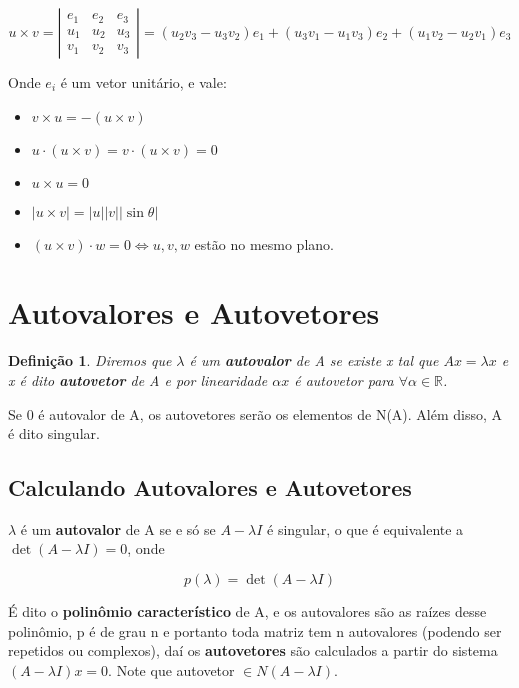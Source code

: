 \documentclass[12pt]{article}
\newtheorem{definition}{Definição}
\begin{document}
$$u \times v = \left| \begin{array}{ccc}
    e_1 & e_2 & e_3 \\
    u_1 & u_2 & u_3 \\
    v_1 & v_2 & v_3
\end{array} \right| = (u_2 v_3 - u_3 v_2)e_1 + (u_3 v_1 - u_1 v_3)e_2 + (u_1 v_2 - u_2 v_1)e_3$$

Onde $e_i$ é um vetor unitário, e vale:

\begin{itemize}
    \item $v \times u = - (u \times v)$
    
    \item $u \cdot (u \times v) = v \cdot (u \times v) = 0$
    
    \item $u \times u = 0$
    
    \item $|u \times v| = |u||v||\sin{\theta}|$
    
    \item $(u \times v) \cdot w = 0 \Leftrightarrow u,v,w $ estão no mesmo plano.
\end{itemize}

\section*{Autovalores e Autovetores}
\begin{definition}
Diremos que $\lambda$ é um \textbf{autovalor} de A se existe x tal que $Ax = \lambda x$ e x é dito \textbf{autovetor} de A e por linearidade $\alpha x$ é autovetor para $\forall \alpha \in \mathbb{R}$.
\end{definition}

Se 0 é autovalor de A, os autovetores serão os elementos de N(A). Além disso, A é dito singular.

\subsection*{Calculando Autovalores e Autovetores}
$\lambda$ é um \textbf{autovalor} de A se e só se $A - \lambda I$ é singular, o que é equivalente a $\det(A - \lambda I) = 0$, onde

$$p(\lambda) = \det(A - \lambda I)$$

É dito o \textbf{polinômio característico} de A, e os autovalores são as raízes desse polinômio, p é de grau n e portanto toda matriz tem n autovalores (podendo ser repetidos ou complexos), daí os \textbf{autovetores} são calculados a partir do sistema $(A - \lambda I)x = 0$. Note que autovetor $\in N(A - \lambda I)$.
\end{document}

